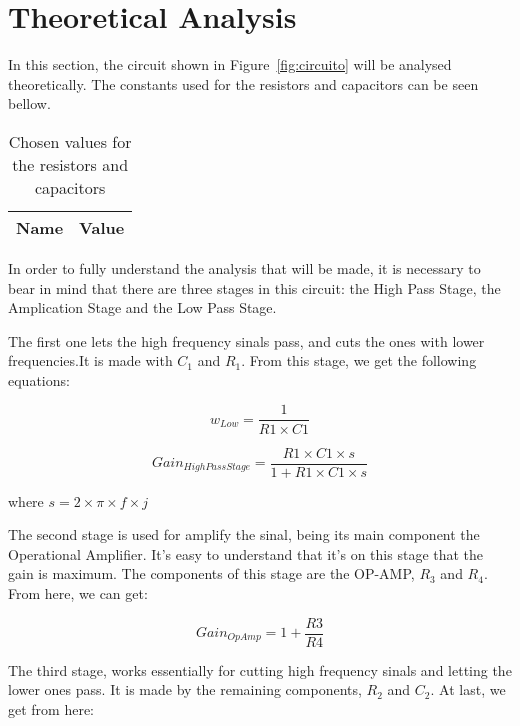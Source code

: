 \section{Theoretical Analysis}
\label{sec:analysis}

\hspace{0,5cm} In this section, the  circuit shown in Figure~\ref{fig:circuito} will be analysed theoretically.
The constants used for the resistors and capacitors can be seen bellow.


\begin{table}[H]
  \centering
  \begin{tabular}{|l|r|}
    \hline    
    {\bf Name} & {\bf Value} \\ \hline
    
  \end{tabular}
  \caption{Chosen values for the resistors and capacitors}
  \label{tab:mat1}
\end{table}


\par In order to fully understand the analysis that will be made, it is necessary to bear in mind that there are three stages in this circuit: the High Pass Stage, the Amplication Stage and the Low Pass Stage. 
\par The first one lets the high frequency sinals pass, and cuts the ones with lower frequencies.It is made with $C_1$ and $R_1$. From this stage, we get the following equations:

\begin{equation}
w_{Low} = \frac{1}{R1 \times C1}
\label{eq:1.1}
\end{equation}

\begin{equation}
Gain_{High Pass Stage} = \frac{R1 \times C1 \times s}{1 + R1 \times C1 \times s}
\label{eq:1.2}
\end{equation}

where $s = 2 \times \pi \times f \times j$

\par The second stage is used for amplify the sinal, being its main component the Operational Amplifier. It's easy to understand that it's on this stage that the gain is maximum. The components of this stage are the OP-AMP, $R_3$ and $R_4$. From here, we can get:

\begin{equation}
Gain_{OpAmp} = 1 + \frac{R3}{R4}
\label{eq:1.3}
\end{equation}

\par The third stage, works essentially for cutting high frequency sinals and letting the lower ones pass. It is made by the remaining components, $R_2$ and $C_2$. At last, we get from here:

